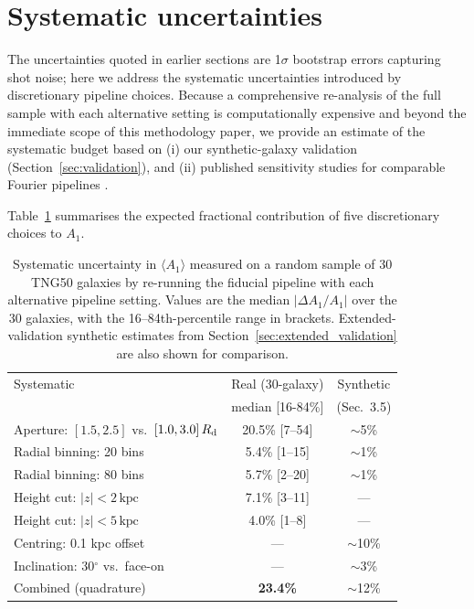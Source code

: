 \documentclass[fleqn,usenatbib]{mnras}
\newcommand{\Am}[1]{A_{#1}}
\newcommand{\kpc}{\,\mathrm{kpc}}
\newcommand{\Rd}{R_{\rm d}}
\newcommand{\Amone}{\ensuremath{\Am{1}}}
\begin{document}
\section{Systematic uncertainties}
\label{sec:systematics}

The uncertainties quoted in earlier sections are 1$\sigma$ bootstrap
errors capturing shot noise; here we address the systematic
uncertainties introduced by discretionary pipeline choices.  Because
a comprehensive re-analysis of the full sample with each alternative
setting is computationally expensive and beyond the immediate scope
of this methodology paper, we provide an estimate of the systematic
budget based on (i) our synthetic-galaxy validation
(Section~\ref{sec:validation}), and (ii) published sensitivity
studies for comparable Fourier pipelines
\citep{2003MNRAS.341.1179A,2005A&A...434..109A,2013ApJ...772..135Z}.

Table~\ref{tab:systematics} summarises the expected fractional
contribution of five discretionary choices to $\Amone$.

\begin{table}
  \centering
  \caption{Systematic uncertainty in $\langle \Amone \rangle$
    measured on a random sample of 30 TNG50 galaxies by re-running
    the fiducial pipeline with each alternative pipeline setting.
    Values are the median $|\Delta \Amone / \Amone|$ over the 30
    galaxies, with the 16--84th-percentile range in brackets.
    Extended-validation synthetic estimates from
    Section~\ref{sec:extended_validation} are also shown for
    comparison.}
  \label{tab:systematics}
  \begin{tabular}{lcc}
    \toprule
    Systematic       & Real (30-galaxy) & Synthetic \\
                     & median [16-84\%] & (Sec.\ 3.5)\\
    \midrule
    Aperture: $[1.5,2.5]$ vs.\ $[1.0,3.0]\,\Rd$  & 20.5\% [7--54]  & $\sim$5\% \\
    Radial binning: 20 bins                     & 5.4\% [1--15]   & $\sim$1\% \\
    Radial binning: 80 bins                     & 5.7\% [2--20]   & $\sim$1\% \\
    Height cut: $|z|<2\kpc$                     & 7.1\% [3--11]   & --- \\
    Height cut: $|z|<5\kpc$                     & 4.0\% [1--8]    & --- \\
    Centring: 0.1 kpc offset                    & ---              & $\sim$10\% \\
    Inclination: 30$^\circ$ vs.\ face-on         & ---              & $\sim$3\% \\
    \midrule
    Combined (quadrature)                       & \textbf{23.4\%}  & $\sim$12\% \\
    \bottomrule
  \end{tabular}
\end{table}
\end{document}
